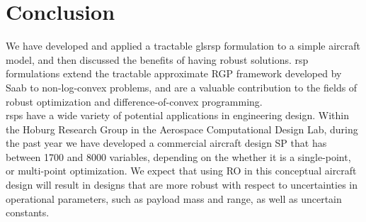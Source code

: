 \section{Conclusion}

We have developed and applied a tractable gls{rsp} formulation to a simple aircraft model,
and then discussed the benefits of having robust solutions. \gls{rsp} formulations extend
the tractable approximate RGP framework developed by Saab to non-log-convex problems,
and are a valuable contribution to the fields of robust optimization and difference-of-convex programming.\\

\gls{rsp}s have a wide variety of potential applications in engineering design.
Within the Hoburg Research Group in the Aerospace Computational Design Lab, during the past year we
have developed a commercial aircraft design SP that has between 1700 and 8000 variables,
depending on the whether it is a single-point, or multi-point optimization.
We expect that using RO in this conceptual aircraft design will result in designs
that are more robust with respect to uncertainties in operational parameters,
such as payload mass and range, as well as uncertain constants.
